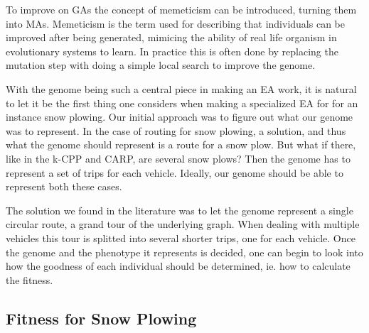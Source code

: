 To improve on GAs the concept of memeticism can be introduced, turning them into MAs. Memeticism is the term used for describing that individuals can be improved after being generated, mimicing the ability of real life organism in evolutionary systems to learn. In practice this is often done by replacing the mutation step with doing a simple local search to improve the genome.

With the genome being such a central piece in making an EA work, it is natural to let it be the first thing one considers when making a specialized EA for for an instance snow plowing. Our initial approach was to figure out what our genome was to represent. In the case of routing for snow plowing, a solution, and thus what the genome should represent is a route for a snow plow. But what if there, like in the k-CPP and CARP, are several snow plows? Then the genome has to represent a set of trips for each vehicle. Ideally, our genome should be able to represent both these cases.

The solution we found in the literature was to let the genome represent a single circular route, a grand tour of the underlying graph. When dealing with multiple vehicles this tour is splitted into several shorter trips, one for each vehicle. Once the genome and the phenotype it represents is decided, one can begin to look into how the goodness of each individual should be determined, ie. how to calculate the fitness.



\subsection{Fitness for Snow Plowing} %
\label{sub:fitness_for_snow_plowing}




